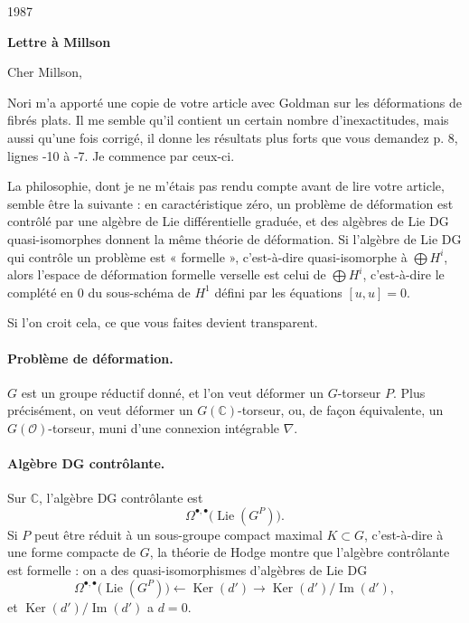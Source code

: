 \documentclass[11pt]{article}
\newcommand{\bbC}{\mathbb{C}}
\newcommand{\Lie}{\operatorname{Lie}}
\newcommand{\Ker}{\operatorname{Ker}}
\newcommand{\Imop}{\operatorname{Im}}
\begin{document}
\begin{flushleft}
1987
\end{flushleft}

\begin{center}
\textbf{Lettre à Millson}
\end{center}

Cher Millson,

Nori m'a apporté une copie de votre article avec Goldman sur les déformations de fibrés plats. Il me semble qu'il contient un certain nombre d'inexactitudes, mais aussi qu'une fois corrigé, il donne les résultats plus forts que vous demandez p. 8, lignes -10 à -7. Je commence par ceux-ci.

La philosophie, dont je ne m'étais pas rendu compte avant de lire votre article, semble être la suivante : en caractéristique zéro, un problème de déformation est contrôlé par une algèbre de Lie différentielle graduée, et des algèbres de Lie DG quasi-isomorphes donnent la même théorie de déformation. Si l'algèbre de Lie DG qui contrôle un problème est « formelle », c'est-à-dire quasi-isomorphe à $\bigoplus H^i$, alors l'espace de déformation formelle verselle est celui de $\bigoplus H^i$, c'est-à-dire le complété en $0$ du sous-schéma de $H^1$ défini par les équations $[u,u]=0$.

Si l'on croit cela, ce que vous faites devient transparent.

\paragraph{Problème de déformation.}
$G$ est un groupe réductif donné, et l'on veut déformer un $G$-torseur $P$. Plus précisément, on veut déformer un $G(\bbC)$-torseur, ou, de façon équivalente, un $G(\mathcal O)$-torseur, muni d'une connexion intégrable $\nabla$.

\paragraph{Algèbre DG contrôlante.}
Sur $\bbC$, l'algèbre DG contrôlante est
\[
  \Omega^{\bullet,\bullet}\bigl(\Lie(G^P)\bigr).
\]
Si $P$ peut être réduit à un sous-groupe compact maximal $K\subset G$, c'est-à-dire à une forme compacte de $G$, la théorie de Hodge montre que l'algèbre contrôlante est formelle : on a des quasi-isomorphismes d'algèbres de Lie DG
\begin{equation}\label{eq:quasi}
  \Omega^{\bullet,\bullet}\bigl(\Lie(G^P)\bigr)
  \longleftarrow
  \Ker(d')
  \longrightarrow
  \Ker(d')/\Imop(d'),
\end{equation}
et $\Ker(d')/\Imop(d')$ a $d=0$.
\end{document}
